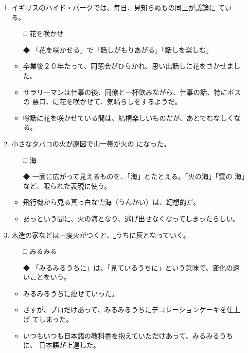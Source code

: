 \documentclass[
uplatex,
b5paper,
10pt,
dvipdfmx
]{jsbook}
\begin{document}
\begin{enumerate}
\item イギリスのハイド・パークでは、毎日、見知らぬもの同士が議論に\underline{  
       }ている。
\begin{itemize}
\item[□] 花を咲かせ
\item[◆] 「花を咲かせる」で「話しがもりあがる」「話しを楽しむ」
\end{itemize}
\begin{itemize}
\item 卒業後２０年たって、同窓会がひらかれ、思い出話しに花をさかせました。
\item サラリーマンは仕事の後、同僚と一杯飲みながら、仕事の話、特にボスの
      悪口、に花を咲かせて、気晴らしをするようだ。
\item 噂話に花を咲かせている間は、結構楽しいものだが、あとでむなしくなる。
\end{itemize}

\item 小さなタバコの火が原因で山一帯が火の\underline{  }になった。
\begin{itemize}
\item[□] 海
\item[◆] 一面に広がって見えるものを、「海」とたとえる。「火の海」「雲の
	  海」など、限られた表現に使う。
\end{itemize}
\begin{itemize}
\item 飛行機から見る真っ白な雲海（うんかい）は、幻想的だ。
\item あっという間に、火の海となり、逃げ出せなくなってしまったらしい。
\end{itemize}

\item 木造の家などは一度火がつくと、\underline{    }うちに灰となっていく。 
\begin{itemize}
\item[□] みるみる
\item[◆] 「みるみるうちに」は、「見ているうちに」という意味で、変化の速
	  いことをいう。
\end{itemize}
\begin{itemize}
\item みるみるうちに痩せていった。
\item さすが、プロだけあって、みるみるうちにデコレーションケーキを仕上げ
      てしまった。
\item いつもいつも日本語の教科書を抱えていただけあって、みるみるうちに、
      日本語が上達した。
\end{itemize}

\end{enumerate}
\end{document}

